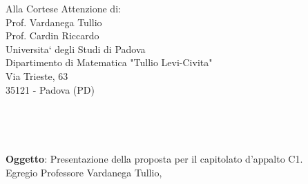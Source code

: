 \documentclass[11pt,a4paper]{letter}
\def\opening#1{\thispagestyle{empty}
{\centering\fromaddress \vspace{0.6in} \\ %
\hspace*{\longindentation}\hspace*{\fill}\par} %
{\raggedright \toname \\ \toaddress \par} %
\vspace{0.1in} %
\noindent #1 %
}
\begin{document}

\begin{letter}
{Alla Cortese Attenzione di:\\
	Prof. Vardanega Tullio\\
	Prof. Cardin Riccardo\\
	Universita` degli Studi di Padova\\
	Dipartimento di Matematica "Tullio Levi-Civita"\\
	Via Trieste, 63\\
	35121 - Padova (PD)\\
}



\opening {\textbf{Oggetto}: Presentazione della proposta per il capitolato d'appalto C1.}\\

\noindent Egregio Professore Vardanega Tullio,


\end{letter}
\end{document}
